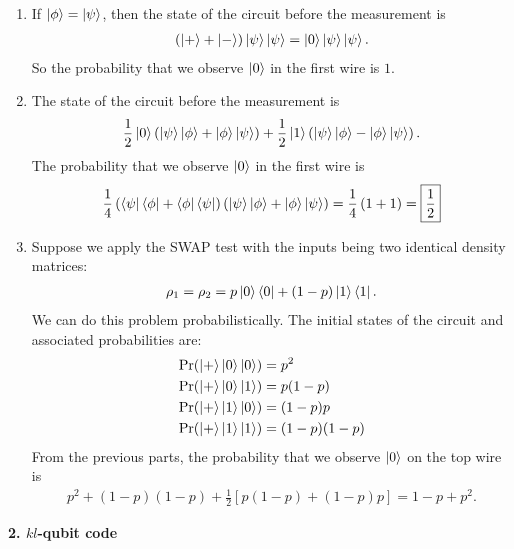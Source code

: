\documentclass{article}
\theoremstyle{definition}
\newcommand{\f}[2]{\frac{#1}{#2}}
\newcommand{\lp}{\left(}
\newcommand{\rp}{\right)}
\newcommand{\lb}{\left[}
\newcommand{\rb}{\right]}
\begin{document}
\begin{enumerate}[label=(\alph*)]
	\item If $\ket{\phi} = \ket{\psi}$, then the state of the circuit before the measurement is 
	\begin{align*}
		(\ket{+} + \ket{-}) \ket{\psi}\ket{\psi} = \ket{0} \ket{\psi} \ket{\psi}.
	\end{align*}
	So the probability that we observe $\ket{0}$ in the first wire is $\boxed{1}$.
	
	\item The state of the circuit before the measurement is 
	\begin{align*}
		\f{1}{2}\ket{0} \lp \ket{\psi}\ket{\phi} + \ket{\phi}\ket{\psi} \rp + \f{1}{2} \ket{1}\lp \ket{\psi}\ket{\phi} - \ket{\phi}\ket{\psi} \rp.
	\end{align*}
	The probability that we observe $\ket{0}$ in the first wire is 
	\begin{align*}
		\f{1}{4}\lp \bra{\psi}\bra{\phi} + \bra{\phi}\bra{\psi} \rp \lp \ket{\psi}\ket{\phi} + \ket{\phi}\ket{\psi} \rp
		= \f{1}{4}\lp 1 + 1 \rp = \boxed{\f{1}{2}} 
	\end{align*}
	
	\item Suppose we apply the SWAP test with the inputs being two identical density matrices:
	\begin{align*}
		\rho_1 = \rho_2= p \ket{0}\bra{0} + (1-p) \ket{1}\bra{1}.
	\end{align*}
	We can do this problem probabilistically. The initial states of the circuit and associated probabilities are:
	\begin{align*}
		\Pr(\ket{+}\ket{0}\ket{0}) &= p^2 \\
		\Pr(\ket{+}\ket{0}\ket{1}) &= p(1-p) \\
		\Pr(\ket{+}\ket{1}\ket{0}) &= (1-p)p \\  
		\Pr(\ket{+}\ket{1}\ket{1}) &= (1-p)(1-p)
	\end{align*}
	From the previous parts, the probability that we observe $\ket{0}$ on the top wire is 
	\begin{align*}
		p^2 + (1-p)(1-p) + \f{1}{2}\lb p(1-p) + (1-p)p \rb =\boxed{ 1 -p + p^2}.
	\end{align*}
	
\end{enumerate}


\noindent \textbf{2. $kl$-qubit code} \\
\end{document}
